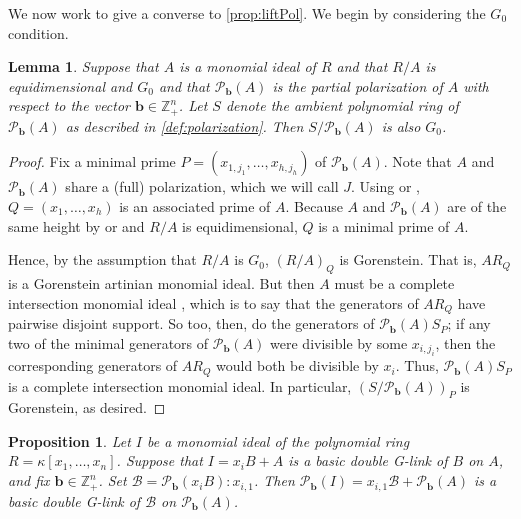 \documentclass[12pt, reqno]{amsart}
\numberwithin{equation}{section}
\newtheorem{proposition}[theorem]{Proposition}
\newtheorem{lemma}[theorem]{Lemma}
\newtheorem{Main Conjecture}[theorem]{Main Conjecture}
\theoremstyle{definition}
\theoremstyle{plain}
\newcommand{\ZZ}{\mathbb{Z}}
\newcommand{\B}{\mathcal{B}}
\renewcommand{\P}{\mathcal{P}}
\newcommand{\bb}{\mathbf{b}}
\begin{document}
We now work to give a converse to \cref{prop:liftPol}.  We begin by considering the $G_0$ condition.

\begin{lemma}\label{lem:G0pol}
    Suppose that $A$ is a monomial ideal of $R$ and that $R/A$ is equidimensional and $G_0$ and that $\P_{\bb}(A)$ is the partial polarization of $A$ with respect to the vector $\bb \in \ZZ_+^n$.  Let $S$ denote the ambient polynomial ring of $\P_{\bb}(A)$ as described in \cref{def:polarization}.  Then $S/\P_{\bb}(A)$ is also $G_0$.
\end{lemma}
\begin{proof}   
Fix a minimal prime $P = (x_{1,j_1}, \ldots, x_{h,j_h})$ of $\P_{\bb}(A)$.  Note that $A$ and $\P_{\bb}(A)$ share a (full) polarization, which we will call $J$.  Using \cite[Proposition 4.4]{Har66} or \cite[Corollary 2.6]{Far06}, $Q = (x_1, \ldots, x_h)$ is an associated prime of $A$.  Because $A$ and $\P_{\bb}(A)$ are of the same height by \cite[Proposition 4.4]{Har66} or \cite[Proposition 2.3]{Far06} and $R/A$ is equidimensional, $Q$ is a minimal prime of $A$.  

Hence, by the assumption that $R/A$ is $G_0$, $(R/A)_Q$ is Gorenstein.  That is, $AR_Q$ is a Gorenstein artinian monomial ideal.  But then $A$ must be a complete intersection monomial ideal \cite[Proposition on Page 2]{Bei93}, which is to say that the generators of $AR_Q$ have pairwise disjoint support.  So too, then, do the generators of $\P_{\bb}(A)S_P$; if any two of the minimal generators of $\P_{\bb}(A)$ were divisible by some $x_{i,j_i}$, then the corresponding generators of $AR_Q$ would both be divisible by $x_i$.  Thus, $\P_{\bb}(A)S_P$ is a complete intersection monomial ideal.  In particular, $(S/\P_{\bb}(A))_P$ is Gorenstein, as desired.
\end{proof}

\begin{proposition}\label{prop:BDLgivesBDLofPolarization}
Let $I$ be a monomial ideal of the polynomial ring $R = \kappa[x_1, \ldots, x_n]$.  Suppose that $I = x_iB+A$ is a basic double G-link of $B$ on $A$, and fix $\bb \in \ZZ_+^n$.  Set $\B = \P_{\bb}(x_iB):x_{i,1}$.  Then $\P_{\bb}(I) = x_{i,1}\B+\P_{\bb}(A)$ is a basic double G-link of $\B$ on $\P_{\bb}(A)$.
\end{proposition}
\end{document}
